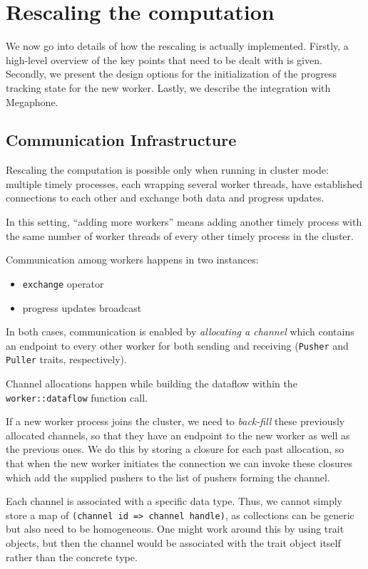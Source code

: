 \documentclass[12pt]{extarticle}
\begin{document}
\section{Rescaling the computation}

We now go into details of how the rescaling is actually implemented.
Firstly, a high-level overview of the key points that need to be dealt with is given.
Secondly, we present the design options for the initialization of the progress tracking state for the new worker.
Lastly, we describe the integration with Megaphone.

\subsection{Communication Infrastructure}

Rescaling the computation is possible only when running in cluster mode: multiple timely processes, each wrapping several worker
threads, have established connections to each other and exchange both data and progress updates.

In this setting, ``adding more workers'' means adding another timely process with the same number of worker threads
of every other timely process in the cluster.

\vspace{3mm}
\noindent
Communication among workers happens in two instances:
\begin{itemize}
    \item \verb|exchange| operator
    \item progress updates broadcast
\end{itemize}

In both cases, communication is enabled by \textit{allocating a channel} which contains an endpoint to every other worker
for both sending and receiving (\verb|Pusher| and \verb|Puller| traits, respectively).

Channel allocations happen while building the dataflow within the \verb|worker::dataflow| function call.

If a new worker process joins the cluster, we need to \textit{back-fill} these previously allocated channels, so that
they have an endpoint to the new worker as well as the previous ones.
We do this by storing a closure for each past allocation, so that when the new worker initiates the connection
we can invoke these closures which add the supplied pushers to the list of pushers forming the channel.

Each channel is associated with a specific data type.
Thus, we cannot simply store a map of \verb|(channel id => channel handle)|, as collections can be generic but also need to be homogeneous.
One might work around this by using trait objects, but then the channel would be associated with the trait object itself rather than the concrete
type.
\end{document}
